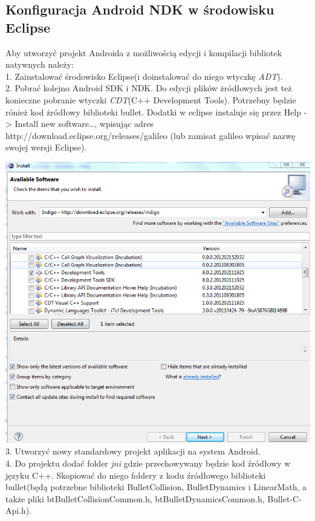 \documentclass[12pt]{article}
\begin{document}
  \subsection{Konfiguracja Android NDK w środowisku Eclipse}
  Aby utworzyć projekt Androida z możliwością edycji i kompilacji bibliotek
  natywnych należy: \\
  1. Zainstalować środowisko Eclipse(i doinstalować do niego wtyczkę
  \emph{ADT}).\\
  2. Pobrać kolejno Android SDK i NDK. Do edycji plików żródłowych jest
  też konieczne pobranie wtyczki \emph{CDT}(C++ Development Tools). Potrzebny
  będzie rónież kod żródłowy biblioteki bullet. Dodatki w eclipse instaluje się przez
  Help -> Install new software\ldots , wpisując adres http://download.eclipse.org/releases/galileo (lub zamisat
  galileo wpisać nazwę swojej wersji Eclipse).
  
  \includegraphics[width=\textwidth]{./img/CDT.png}
  3. Utworzyć nowy standardowy projekt aplikacji na system Android.\\
  4. Do projektu dodać folder \emph{jni} gdzie przechowywany będzie kod źródłowy
  w języku C++. Skopiować do niego foldery z kodu źródłowego biblioteki
  bullet(będą potrzebne biblioteki BulletCollision, BulletDynamics i
  LinearMath, a także pliki btBulletCollisionCommon.h,
  btBulletDynamicsCommon.h, Bullet-C-Api.h).
  
\end{document}
